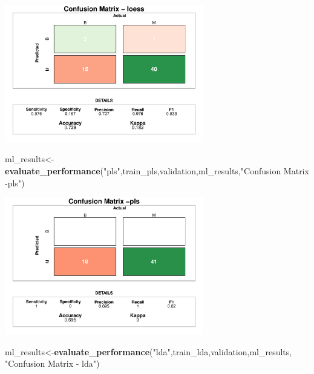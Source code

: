\documentclass[]{article}
\newenvironment{Shaded}{\begin{snugshade}}{\end{snugshade}}
\newcommand{\KeywordTok}[1]{\textcolor[rgb]{0.13,0.29,0.53}{\textbf{#1}}}
\newcommand{\NormalTok}[1]{#1}
\newcommand{\StringTok}[1]{\textcolor[rgb]{0.31,0.60,0.02}{#1}}
\begin{document}
\begin{center}
\includegraphics[width=0.65\textwidth]{LiverDisease_files/figure-latex/unnamed-chunk-41-1.pdf}
\end{center}

\begin{Shaded}
\begin{Highlighting}[]
\NormalTok{ml_results<-}\KeywordTok{evaluate_performance}\NormalTok{(}\StringTok{"pls"}\NormalTok{,train_pls,validation,ml_results,}\StringTok{"Confusion Matrix -pls"}\NormalTok{)}
\end{Highlighting}
\end{Shaded}

\begin{center}
\includegraphics[width=0.65\textwidth]{LiverDisease_files/figure-latex/unnamed-chunk-42-1.pdf}
\end{center}

\begin{Shaded}
\begin{Highlighting}[]
\NormalTok{ml_results<-}\KeywordTok{evaluate_performance}\NormalTok{(}\StringTok{"lda"}\NormalTok{,train_lda,validation,ml_results, }\StringTok{"Confusion Matrix - lda"}\NormalTok{)}
\end{Highlighting}
\end{Shaded}
\end{document}
